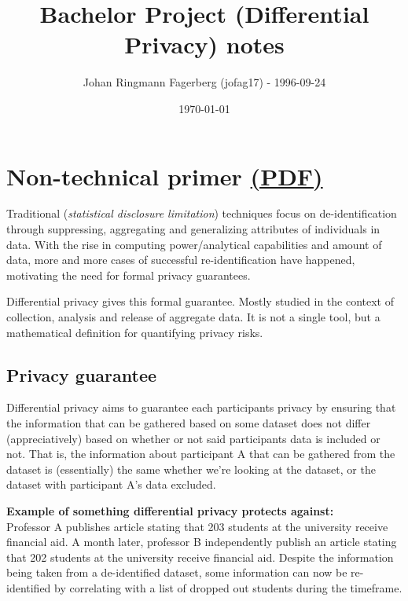 \documentclass[a4paper]{article}
\title{Bachelor Project (Differential Privacy) notes}
\author{Johan Ringmann Fagerberg (jofag17) - 1996-09-24}
\date{\today}
\begin{document}
\maketitle

\tableofcontents

\newpage

\section{Non-technical primer \hfill\href{https://privacytools.seas.harvard.edu/files/privacytools/files/pedagogical-document-dp_0.pdf}{(PDF)}}

Traditional (\textit{statistical disclosure limitation}) techniques focus on de-identification through suppressing, aggregating and generalizing attributes of individuals in data. With the rise in computing power/analytical capabilities and amount of data, more and more cases of successful re-identification have happened, motivating the need for formal privacy guarantees.

Differential privacy gives this formal guarantee. Mostly studied in the context of collection, analysis and release of aggregate data. It is not a single tool, but a mathematical definition for quantifying privacy risks.

\subsection{Privacy guarantee}

Differential privacy aims to guarantee each participants privacy by ensuring that the information that can be gathered based on some dataset does not differ (appreciatively) based on whether or not said participants data is included or not. That is, the information about participant A that can be gathered from the dataset is (essentially) the same whether we're looking at the dataset, or the dataset with participant A's data excluded.

\begin{mdframed}
\textbf{Example of something differential privacy protects against:}\\
Professor A publishes article stating that 203 students at the university receive financial aid. A month later, professor B independently publish an article stating that 202 students at the university receive financial aid. Despite the information being taken from a de-identified dataset, some information can now be re-identified by correlating with a list of dropped out students during the timeframe.
\end{mdframed}
\end{document}
